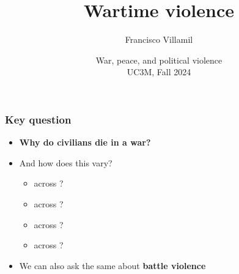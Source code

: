 \documentclass[aspectratio=43]{beamer}
\title{\huge Wartime violence}
\author{Francisco Villamil}
\date{War, peace, and political violence\\UC3M, Fall 2024}
\begin{document}
\begin{frame}
  \titlepage
\end{frame}







\begin{frame}
\frametitle{Key question}
\centering

\begin{itemize}[<+->]
  \item \textbf{Why do civilians die in a war?}
  \item And how does this vary?
  \begin{itemize}
    \item across ?
    \item across ?
    \item across ?
    \item across ?
  \end{itemize}
  \item We can also ask the same about \textbf{battle violence}
\end{itemize}



\end{frame}
\end{document}
